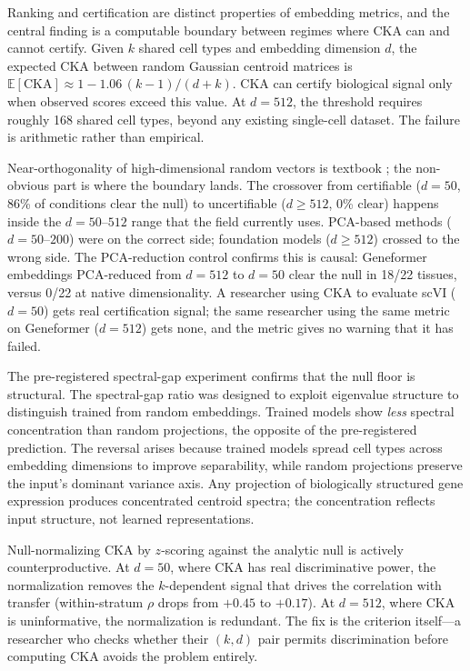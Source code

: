 \documentclass[11pt]{article}
\begin{document}
Ranking and certification are distinct properties of embedding metrics,
and the central finding is a computable boundary between regimes where
CKA can and cannot certify. Given $k$ shared cell types and embedding
dimension $d$, the expected CKA between random Gaussian centroid
matrices is $\mathbb{E}[\mathrm{CKA}] \approx 1 -
1.06\,(k{-}1)/(d{+}k)$. CKA can certify biological signal only when
observed scores exceed this value. At $d = 512$, the threshold requires
roughly 168 shared cell types, beyond any existing single-cell dataset.
The failure is arithmetic rather than empirical.

Near-orthogonality of high-dimensional random vectors is textbook
\citep{johnsonlindenstrauss1984}; the non-obvious part is where the
boundary lands. The crossover from certifiable ($d = 50$, 86\% of
conditions clear the null) to uncertifiable ($d \geq 512$, 0\% clear)
happens inside the $d = 50$--$512$ range that the field currently uses.
PCA-based methods ($d = 50$--$200$) were on the correct side; foundation
models ($d \geq 512$) crossed to the wrong side. The PCA-reduction
control confirms this is causal: Geneformer embeddings PCA-reduced from
$d = 512$ to $d = 50$ clear the null in 18/22 tissues, versus 0/22 at
native dimensionality. A researcher using CKA to evaluate scVI
($d = 50$) gets real certification signal; the same researcher using the
same metric on Geneformer ($d = 512$) gets none, and the metric gives no
warning that it has failed.

The pre-registered spectral-gap experiment confirms that the null floor
is structural. The spectral-gap ratio was designed to exploit eigenvalue
structure to distinguish trained from random embeddings. Trained models
show \emph{less} spectral concentration than random projections, the
opposite of the pre-registered prediction. The reversal arises because
trained models spread cell types across embedding dimensions to improve
separability, while random projections preserve the input's dominant
variance axis. Any projection of biologically structured gene expression
produces concentrated centroid spectra; the concentration reflects input
structure, not learned representations.

Null-normalizing CKA by $z$-scoring against the analytic null is
actively counterproductive. At $d = 50$, where CKA has real
discriminative power, the normalization removes the $k$-dependent signal
that drives the correlation with transfer (within-stratum $\rho$ drops
from $+0.45$ to $+0.17$). At $d = 512$, where CKA is uninformative,
the normalization is redundant. The fix is the criterion itself---a
researcher who checks whether their $(k, d)$ pair permits discrimination
before computing CKA avoids the problem entirely.
\end{document}
